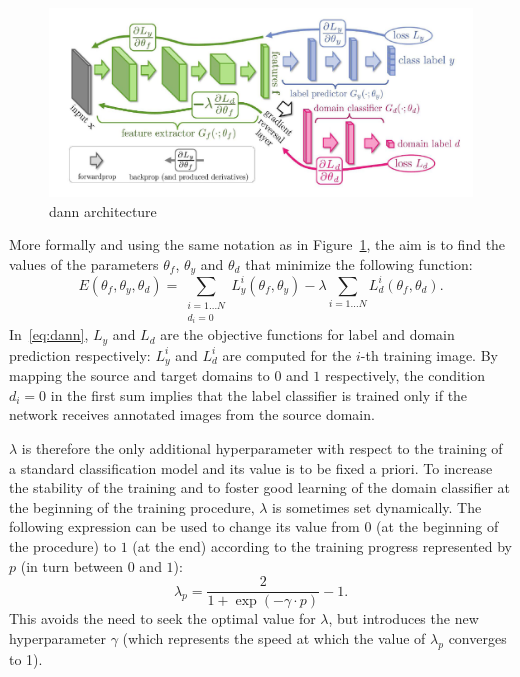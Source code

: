 \documentclass[%
    corpo=12pt,
    twoside,
    stile=classica,   
    tipotesi=magistrale,
    evenboxes,
    english,
	numerazioneromana,
]{toptesi}
\begin{document}
\begin{figure}[ht!]
	\centering
	\includegraphics[width=0.95\linewidth]{imgs/dann.png}
	\caption{\gls{dann} architecture\cite{ganin2015unsupervised}}
	\label{fig:dann}
\end{figure}

More formally and using the same notation as in Figure~\ref{fig:dann}, the aim is to find the values of the parameters $\theta_f$, $\theta_y$ and $\theta_d$ that minimize the following function:
\begin{equation}
	E(\theta_f, \theta_y, \theta_d) = \sum_{
		\substack{i=1\ldots N\\d_i=0}
	}L^{i}_{y}\left(\theta_f, \theta_y\right) - 
	\lambda \sum_{i=1\ldots N}L^{i}_{d}\left(\theta_f, \theta_d\right).
	\label{eq:dann}
\end{equation}
In~\eqref{eq:dann}, $L_y$ and $L_d$ are the objective functions for label and domain prediction respectively: $L^{i}_{y}$ and $L^{i}_{d}$ are computed for the $i$-th training image. By mapping the source and target domains to $0$ and $1$ respectively, the condition $d_i=0$ in the first sum implies that the label classifier is trained only if the network receives annotated images from the source domain.

$\lambda$ is therefore the only additional hyperparameter with respect to the training of a standard classification model and its value is to be fixed a priori. To increase the stability of the training and to foster good learning of the domain classifier at the beginning of the training procedure, $\lambda$ is sometimes set dynamically. The following expression can be used to change its value from $0$ (at the beginning of the procedure) to $1$ (at the end) according to the training progress represented by $p$ (in turn between $0$ and $1$):
\begin{equation}
	\lambda_p = \frac{2}{1 + \exp{\left(-\gamma\cdot p\right)}} - 1.
\end{equation}
This avoids the need to seek the optimal value for $\lambda$, but introduces the new hyperparameter $\gamma$ (which represents the speed at which the value of $\lambda_p$ converges to 1).
\end{document}
